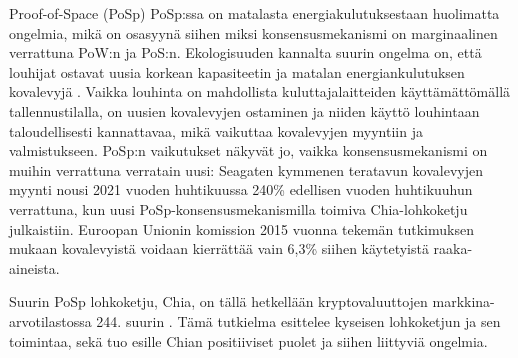 \begin{section}{Proof-of-Space (PoSp)\label{posp}}
PoSp:ssa on matalasta energiakulutuksestaan huolimatta ongelmia, mikä on osasyynä siihen miksi konsensusmekanismi on marginaalinen verrattuna PoW:n ja PoS:n. Ekologisuuden kannalta suurin ongelma on, että louhijat ostavat uusia korkean kapasiteetin ja matalan energiankulutuksen kovalevyjä \cite{chiaseagate1, chiaseagate2}. Vaikka louhinta on mahdollista kuluttajalaitteiden käyttämättömällä tallennustilalla, on uusien kovalevyjen ostaminen ja niiden käyttö louhintaan taloudellisesti kannattavaa, mikä vaikuttaa kovalevyjen myyntiin ja valmistukseen. PoSp:n vaikutukset näkyvät jo, vaikka konsensusmekanismi on muihin verrattuna verratain uusi: Seagaten kymmenen teratavun kovalevyjen myynti nousi 2021 vuoden huhtikuussa 240\% edellisen vuoden huhtikuuhun verrattuna, kun uusi PoSp-konsensusmekanismilla toimiva Chia-lohkoketju julkaistiin. Euroopan Unionin komission 2015 vuonna tekemän tutkimuksen \cite[p.~60]{manufacturingcarbon1} mukaan kovalevyistä voidaan kierrättää vain 6,3\% siihen käytetyistä raaka-aineista.

Suurin PoSp lohkoketju, Chia, on tällä hetkellään kryptovaluuttojen markkina-arvotilastossa 244. suurin \cite{Coingecko}. Tämä tutkielma esittelee kyseisen lohkoketjun ja sen toimintaa, sekä tuo esille Chian positiiviset puolet ja siihen liittyviä ongelmia.



\end{section}